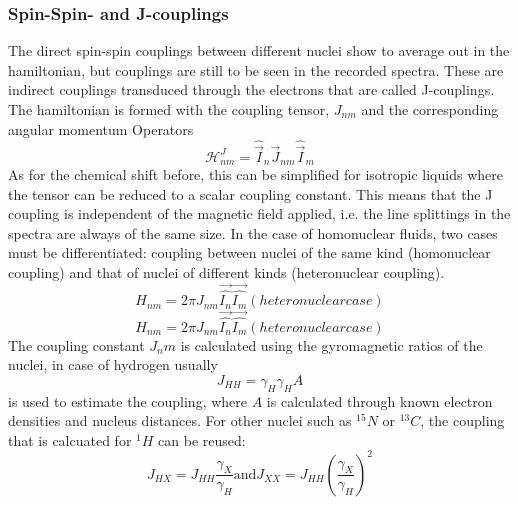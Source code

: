         \subsubsection{Spin-Spin- and J-couplings}
            The direct spin-spin couplings between different nuclei show to average out in the hamiltonian, but couplings are still to be seen in the recorded spectra. These are indirect couplings transduced through the electrons that are called J-couplings. The hamiltonian is formed with the coupling tensor, $J_{nm}$ and the corresponding angular momentum Operators
            \begin{equation}
                \mathcal{H}^J_{nm} = \hat{\vec I}_n \vec J_{nm} \hat{\vec I}_m
            \end{equation}
            As for the chemical shift before, this can be simplified for isotropic liquids where the tensor can be reduced to a scalar coupling constant. This means that the J coupling is independent of the magnetic field applied, i.e. the line splittings in the spectra are always of the same size. In the case of homonuclear fluids, two cases must be differentiated: coupling between nuclei of the same kind (homonuclear coupling) and that of nuclei of different kinds (heteronuclear coupling).
            \begin{equation}
                H_{nm} = 2\pi J_{nm} \vec{\hat{I_n}} \vec{\hat{I_m}} (heteronuclear case)
            \end{equation}
            \begin{equation}
                H_{nm} = 2\pi J_{nm} \vec{\hat{I_n}} \vec{\hat{I_m}} (heteronuclear case)
            \end{equation}
            The coupling constant $J_nm$ is calculated using the gyromagnetic ratios of the nuclei, in case of hydrogen usually 
            \begin{equation}
                J_{HH} = \gamma_H \gamma_H A
            \end{equation}
            is used to estimate the coupling, where $A$ is calculated through known electron densities and nucleus distances.
            For other nuclei such as $^{15}N$ or $^{13}C$, the coupling that is calcuated for $^1H$ can be reused:
            \begin{equation}
            J_{HX} = J_{HH} \frac{\gamma_X}{\gamma_H} \mathrm{and} J_{XX} = J_{HH} \left(\frac{\gamma_X}{\gamma_H} \right)^2
            \end{equation}


